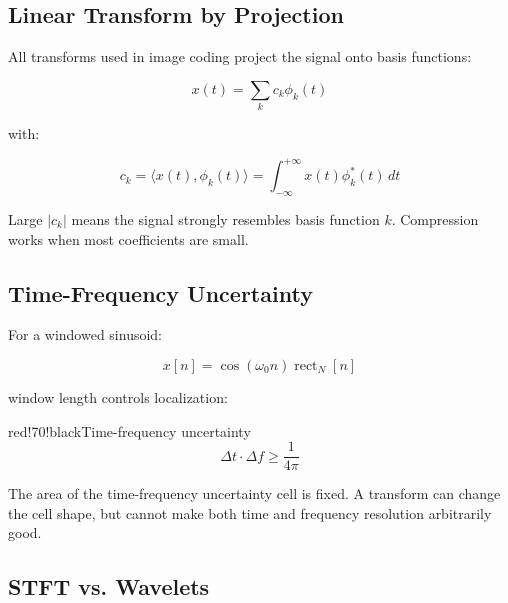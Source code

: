 \subsection{Linear Transform by Projection}

All transforms used in image coding project the signal onto basis functions:

\[
x(t)=\sum_k c_k\phi_k(t)
\]

with:

\[
c_k=\langle x(t),\phi_k(t)\rangle
=
\int_{-\infty}^{+\infty}x(t)\phi_k^*(t)\,dt
\]

Large $|c_k|$ means the signal strongly resembles basis function $k$. Compression works when most coefficients are small.

\subsection{Time-Frequency Uncertainty}

For a windowed sinusoid:

\[
x[n]=\cos(\omega_0 n)\operatorname{rect}_N[n]
\]

window length controls localization:

\begin{center}
\end{center}

\begin{calloutbox}{red!70!black}{Time-frequency uncertainty}
\[
\Delta t\cdot\Delta f\geq\frac{1}{4\pi}
\]

The area of the time-frequency uncertainty cell is fixed. A transform can change the cell shape, but cannot make both time and frequency resolution arbitrarily good.
\end{calloutbox}

\subsection{STFT vs. Wavelets}

